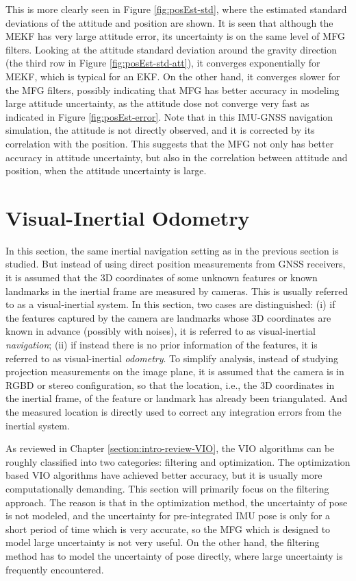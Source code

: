This is more clearly seen in Figure \ref{fig:posEst-std}, where the estimated standard deviations of the attitude and position are shown.
It is seen that although the MEKF has very large attitude error, its uncertainty is on the same level of MFG filters.
Looking at the attitude standard deviation around the gravity direction (the third row in Figure \ref{fig:posEst-std-att}), it converges exponentially for MEKF, which is typical for an EKF.
On the other hand, it converges slower for the MFG filters, possibly indicating that MFG has better accuracy in modeling large attitude uncertainty, as the attitude dose not converge very fast as indicated in Figure \ref{fig:posEst-error}.
Note that in this IMU-GNSS navigation simulation, the attitude is not directly observed, and it is corrected by its correlation with the position.
This suggests that the MFG not only has better accuracy in attitude uncertainty, but also in the correlation between attitude and position, when the attitude uncertainty is large.

\section{Visual-Inertial Odometry} \label{section:VIO}

In this section, the same inertial navigation setting as in the previous section is studied.
But instead of using direct position measurements from GNSS receivers, it is assumed that the 3D coordinates of some unknown features or known landmarks in the inertial frame are measured by cameras.
This is usually referred to as a visual-inertial system.
In this section, two cases are distinguished: (i) if the features captured by the camera are landmarks whose 3D coordinates are known in advance (possibly with noises), it is referred to as visual-inertial \textit{navigation};
(ii) if instead there is no prior information of the features, it is referred to as visual-inertial \textit{odometry}.
To simplify analysis, instead of studying projection measurements on the image plane, it is assumed that the camera is in RGBD or stereo configuration, so that the location, i.e., the 3D coordinates in the inertial frame, of the feature or landmark has already been triangulated.
And the measured location is directly used to correct any integration errors from the inertial system.

As reviewed in Chapter \ref{section:intro-review-VIO}, the VIO algorithms can be roughly classified into two categories: filtering and optimization.
The optimization based VIO algorithms have achieved better accuracy, but it is usually more computationally demanding.
This section will primarily focus on the filtering approach.
The reason is that in the optimization method, the uncertainty of pose is not modeled, and the uncertainty for pre-integrated IMU pose is only for a short period of time which is very accurate, so the MFG which is designed to model large uncertainty is not very useful.
On the other hand, the filtering method has to model the uncertainty of pose directly, where large uncertainty is frequently encountered.

